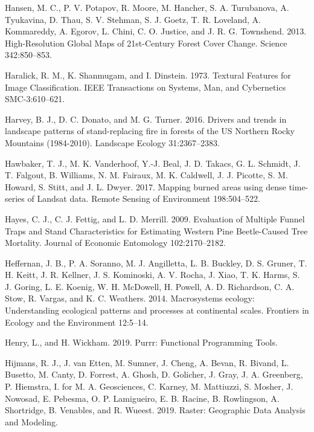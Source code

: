 \documentclass[twoside,12pt,final]{ucthesis-CA2012}
\begin{document}
\begin{ucmainmatter}
\hypertarget{ref-hansen2013}{}
Hansen, M. C., P. V. Potapov, R. Moore, M. Hancher, S. A. Turubanova, A.
Tyukavina, D. Thau, S. V. Stehman, S. J. Goetz, T. R. Loveland, A.
Kommareddy, A. Egorov, L. Chini, C. O. Justice, and J. R. G. Townshend.
2013. High-Resolution Global Maps of 21st-Century Forest Cover Change.
Science 342:850--853.

\hypertarget{ref-haralick1973}{}
Haralick, R. M., K. Shanmugam, and I. Dinstein. 1973. Textural Features
for Image Classification. IEEE Transactions on Systems, Man, and
Cybernetics SMC-3:610--621.

\hypertarget{ref-harvey2016b}{}
Harvey, B. J., D. C. Donato, and M. G. Turner. 2016. Drivers and trends
in landscape patterns of stand-replacing fire in forests of the US
Northern Rocky Mountains (1984-2010). Landscape Ecology 31:2367--2383.

\hypertarget{ref-hawbaker2017}{}
Hawbaker, T. J., M. K. Vanderhoof, Y.-J. Beal, J. D. Takacs, G. L.
Schmidt, J. T. Falgout, B. Williams, N. M. Fairaux, M. K. Caldwell, J.
J. Picotte, S. M. Howard, S. Stitt, and J. L. Dwyer. 2017. Mapping
burned areas using dense time-series of Landsat data. Remote Sensing of
Environment 198:504--522.

\hypertarget{ref-hayes2009}{}
Hayes, C. J., C. J. Fettig, and L. D. Merrill. 2009. Evaluation of
Multiple Funnel Traps and Stand Characteristics for Estimating Western
Pine Beetle-Caused Tree Mortality. Journal of Economic Entomology
102:2170--2182.

\hypertarget{ref-heffernan2014}{}
Heffernan, J. B., P. A. Soranno, M. J. Angilletta, L. B. Buckley, D. S.
Gruner, T. H. Keitt, J. R. Kellner, J. S. Kominoski, A. V. Rocha, J.
Xiao, T. K. Harms, S. J. Goring, L. E. Koenig, W. H. McDowell, H.
Powell, A. D. Richardson, C. A. Stow, R. Vargas, and K. C. Weathers.
2014. Macrosystems ecology: Understanding ecological patterns and
processes at continental scales. Frontiers in Ecology and the
Environment 12:5--14.

\hypertarget{ref-henry2019}{}
Henry, L., and H. Wickham. 2019. Purrr: Functional Programming Tools.

\hypertarget{ref-hijmans2019}{}
Hijmans, R. J., J. van Etten, M. Sumner, J. Cheng, A. Bevan, R. Bivand,
L. Busetto, M. Canty, D. Forrest, A. Ghosh, D. Golicher, J. Gray, J. A.
Greenberg, P. Hiemstra, I. for M. A. Geosciences, C. Karney, M.
Mattiuzzi, S. Mosher, J. Nowosad, E. Pebesma, O. P. Lamigueiro, E. B.
Racine, B. Rowlingson, A. Shortridge, B. Venables, and R. Wueest. 2019.
Raster: Geographic Data Analysis and Modeling.


\end{ucmainmatter}
\end{document}
